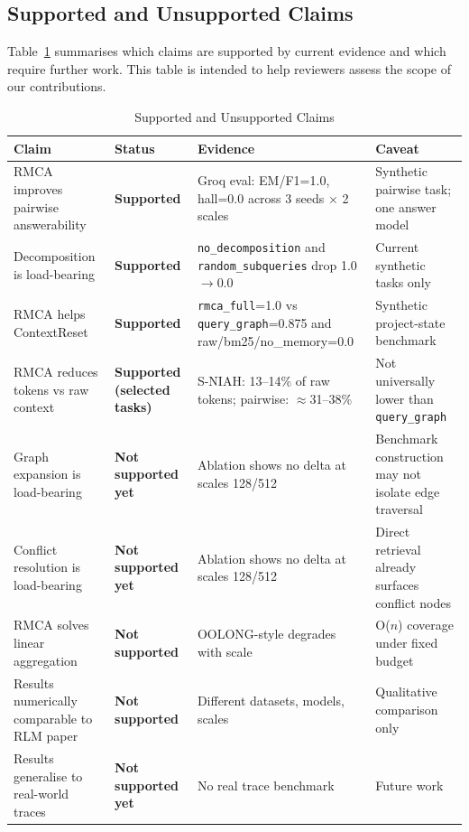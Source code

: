 \documentclass[conference]{IEEEtran}
\begin{document}
\subsection{Supported and Unsupported Claims}
\label{sec:claims}

Table~\ref{tab:claims} summarises which claims are supported by current evidence
and which require further work. This table is intended to help reviewers assess
the scope of our contributions.

\begin{table}[htbp]
\caption{Supported and Unsupported Claims}
\label{tab:claims}
\centering
\begin{tabular}{p{3.5cm}p{1.8cm}p{4.5cm}p{3.5cm}}
\toprule
\textbf{Claim} & \textbf{Status} & \textbf{Evidence} & \textbf{Caveat} \\
\midrule
RMCA improves pairwise answerability & \textbf{Supported} & Groq eval: EM/F1=1.0, hall=0.0 across 3 seeds $\times$ 2 scales & Synthetic pairwise task; one answer model \\
\midrule
Decomposition is load-bearing & \textbf{Supported} & \texttt{no\_decomposition} and \texttt{random\_subqueries} drop 1.0$\to$0.0 & Current synthetic tasks only \\
\midrule
RMCA helps ContextReset & \textbf{Supported} & \texttt{rmca\_full}=1.0 vs \texttt{query\_graph}=0.875 and raw/bm25/no\_memory=0.0 & Synthetic project-state benchmark \\
\midrule
RMCA reduces tokens vs raw context & \textbf{Supported (selected tasks)} & S-NIAH: 13--14\% of raw tokens; pairwise: $\approx$31--38\% & Not universally lower than \texttt{query\_graph} \\
\midrule
Graph expansion is load-bearing & \textbf{Not supported yet} & Ablation shows no delta at scales 128/512 & Benchmark construction may not isolate edge traversal \\
\midrule
Conflict resolution is load-bearing & \textbf{Not supported yet} & Ablation shows no delta at scales 128/512 & Direct retrieval already surfaces conflict nodes \\
\midrule
RMCA solves linear aggregation & \textbf{Not supported} & OOLONG-style degrades with scale & O($n$) coverage under fixed budget \\
\midrule
Results numerically comparable to RLM paper & \textbf{Not supported} & Different datasets, models, scales & Qualitative comparison only \\
\midrule
Results generalise to real-world traces & \textbf{Not supported yet} & No real trace benchmark & Future work \\
\bottomrule
\end{tabular}
\end{table}
\end{document}
